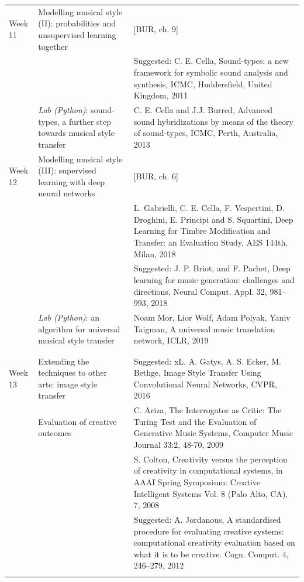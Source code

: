 \documentclass[letterpaper]{inzane_syllabus} %
\begin{document}
\begin{center}
\begin{tabularx}{\textwidth}{p{2cm}p{8cm} @{\hskip 0.5cm} p{9.5cm}}
Week 11 & Modelling musical style (II): probabilities and unsupervised learning together & [BUR, ch. 9] \\

& & Suggested: C. E. Cella, Sound-types: a new framework for symbolic sound analysis and synthesis, ICMC, Huddersfield, United Kingdom, 2011 \\

&\emph{Lab (Python)}: sound-types, a further step towards musical style transfer & C. E. Cella and J.J. Burred, Advanced sound hybridizations by means of the theory of sound-types, ICMC, Perth, Australia, 2013 \\

\arrayrulecolor{maingray}\hline
Week 12 & Modelling musical style (III): supervised learning with deep neural networks &  [BUR, ch. 6] \\
& &  L. Gabrielli, C. E. Cella, F. Vespertini, D. Droghini, E. Principi and S. Squartini, Deep Learning for Timbre Modification and Transfer: an Evaluation Study, AES 144th, Milan, 2018 \\
& & Suggested: J. P. Briot, and F. Pachet, Deep learning for music generation: challenges and directions, Neural Comput. Appl. 32, 981–993, 2018 \\

&\emph{ Lab (Python)}: an algorithm for universal musical style transfer &   Noam Mor, Lior Wolf, Adam Polyak, Yaniv Taigman, A universal music translation network, ICLR, 2019 \\
& & \\ 

\arrayrulecolor{myCOLOR}\hline
\multicolumn{2}{l}{\textbf{\textcolor{myCOLOR}{\large MODULE 3: Connections}}} \\
\hline
\arrayrulecolor{maingray}\hline

Week 13 & Extending the techniques to other arts: image style transfer & Suggested: xL. A. Gatys, A. S. Ecker, M. Bethge, Image Style Transfer Using Convolutional Neural Networks, CVPR, 2016 \\ 
&Evaluation of creative outcomes & C. Ariza, The Interrogator as Critic: The Turing Test and the Evaluation of Generative Music Systems, Computer Music Journal 33:2, 48-70, 2009  \\
& & S. Colton, Creativity versus the perception of creativity in computational systems, in AAAI Spring Symposium: Creative Intelligent Systems Vol. 8 (Palo Alto, CA), 7, 2008 \\
& & Suggested: A. Jordanous, A standardised procedure for evaluating creative systems:
computational creativity evaluation based on what it is to be creative. Cogn. Comput. 4, 246–279, 2012 \\
\arrayrulecolor{maingray}\hline


\end{tabularx}
\end{center}
\end{document}
